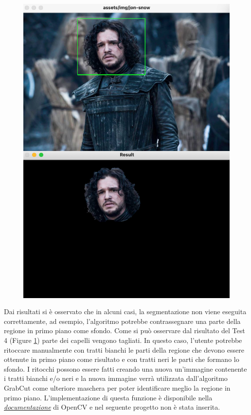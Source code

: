 \documentclass{article}
\begin{document}
\begin{figure}[H]
\begin{minipage}{.5\textwidth}
  \label{fig:test4}
\end{minipage}
\end{figure}


\begin{figure}[H]
\includegraphics[scale=0.35]{test-jon-snow}
\centering
{}
\label{fig:test5}
\end{figure}

Dai risultati si è osservato che in alcuni casi, la segmentazione non viene eseguita correttamente, ad esempio, l'algoritmo potrebbe contrassegnare una parte della regione in primo piano come sfondo. 
Come si può osservare dal risultato del Test 4 (Figure \ref{fig:test4}) parte dei capelli vengono tagliati.
In questo caso, l'utente potrebbe ritoccare manualmente con tratti bianchi le parti della regione che devono essere ottenute in primo piano come risultato e con tratti neri le parti che formano lo sfondo. 
I ritocchi possono essere fatti creando una nuova un'immagine contenente i tratti bianchi e/o neri e la nuova immagine verrà utilizzata dall'algoritmo GrabCut come ulteriore maschera per poter identificare meglio la regione in primo piano. L'implementazione di questa funzione è disponibile nella \href{https://docs.opencv.org/3.4/d8/d83/tutorial_py_grabcut.html}{\textit{documentazione}} di OpenCV e nel seguente progetto non è stata inserita.
\end{document}

